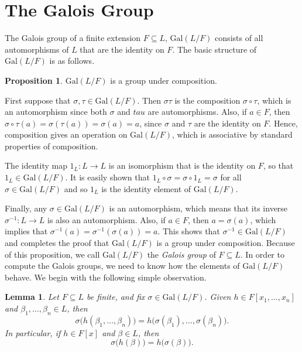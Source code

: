 \documentclass{article}
\makeatletter
\newtheorem{lemma}{Lemma}
\theoremstyle{definition}
\newtheorem{prop}{Proposition}
\theoremstyle{remark}
\let\oldproofname=\proofname
\renewcommand{\proofname}{\bf{\textit{\oldproofname}}}
\theoremstyle{definition}
\renewenvironment{proof}[1][\proofname]{\par
  \pushQED{\qed}%
  \normalfont \topsep6\p@\@plus6\p@\relax
  \list{}{\leftmargin=0mm
          \rightmargin=0mm
          \settowidth{\itemindent}{\itshape#1}%
          \labelwidth=\itemindent
          \parsep=0pt \listparindent=0mm%
  }
  \item[\hskip\labelsep
        \itshape
    #1\@addpunct{.}]\ignorespaces
}{%
  \popQED\endlist\@endpefalse
}
\makeatother
\begin{document}
\section{The Galois Group}
    The Galois group of a finite extension $F\subseteq L$, $\text{Gal}(L/F)$ consists of all automorphisms of $L$ that are the identity on $F$. The basic structure of $\text{Gal}(L/F)$ is as follows.
    \begin{prop}
        $\text{Gal}(L/F)$ is a group under composition.
    \end{prop}
        \begin{proof}
            First suppose that $\sigma,\tau\in\text{Gal}(L/F)$. Then $\sigma\tau$ is the composition $\sigma\circ\tau$, which is an automorphism since both $\sigma$ and $tau$ are automorphisms. Also, if $a\in F$, then $\sigma\circ\tau(a)=\sigma(\tau(a))=\sigma(a)=a$, since $\sigma$ and $\tau$ are the identity on $F$. Hence, composition gives an operation on $\text{Gal}(L/F)$, which is associative by standard properties of composition.\par\hspace{4mm} The identity map $1_L\colon L\rightarrow L$ is an isomorphism that is the identity on $F$, so that $1_L\in\text{Gal}(L/F)$. It is easily shown that $1_L\circ\sigma=\sigma\circ 1_L=\sigma$ for all $\sigma\in\text{Gal}(L/F)$ and so $1_L$ is the identity element of $\text{Gal}(L/F)$.\par\hspace{4mm} Finally, any $\sigma\in\text{Gal}(L/F)$ is an automorphism, which means that its inverse $\sigma^{-1}\colon L\rightarrow L$ is also an automorphism. Also, if $a\in F$, then $a=\sigma(a)$, which implies that $\sigma^{-1}(a)=\sigma^{-1}(\sigma(a))=a$. This shows that $\sigma^{-1}\in\text{Gal}(L/F)$ and completes the proof that $\text{Gal}(L/F)$ is a group under composition.
        \end{proof}
    Because of this proposition, we call $\text{Gal}(L/F)$ the \textit{Galois group} of $F\subseteq L$. In order to compute the Galois groups, we need to know how the elements of $\text{Gal}(L/F)$ behave. We begin with the following simple observation.
    \begin{lemma}
        Let $F\subseteq L$ be finite, and fix $\sigma\in\text{Gal}(L/F)$. Given $h\in F[x_1,\dots,x_n]$ and $\beta_1,\dots,\beta_n\in L$, then 
            \begin{equation*}
                \sigma\big(h(\beta_1,\dots,\beta_n)\big)=h\big(\sigma(\beta_1),\dots,\sigma(\beta_n)\big).
            \end{equation*}
        In particular, if $h\in F[x]$ and $\beta\in L$, then 
            \begin{equation*}
                \sigma\big(h(\beta)\big)=h\big(\sigma(\beta)\big).
            \end{equation*}
    \end{lemma}
\end{document}
